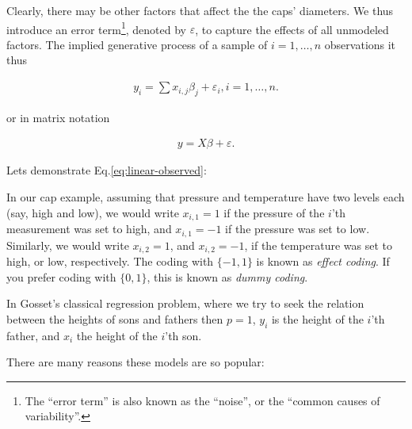 \documentclass[]{book}
\theoremstyle{definition}
\theoremstyle{definition}
\theoremstyle{remark}
\begin{document}
Clearly, there may be other factors that affect the the caps' diameters.
We thus introduce an error term\footnote{The ``error term'' is also
  known as the ``noise'', or the ``common causes of variability''.},
denoted by \(\varepsilon\), to capture the effects of all unmodeled
factors. The implied generative process of a sample of \(i=1,\dots,n\)
observations it thus

\begin{align}
  y_i = \sum x_{i,j} \beta_j + \varepsilon_i , i=1,\dots,n .
  \label{eq:linear-observed}
\end{align}

or in matrix notation

\begin{align}
  y = X \beta + \varepsilon .
  \label{eq:linear-matrix}
\end{align}

Lets demonstrate Eq.\eqref{eq:linear-observed}:

In our cap example, assuming that pressure and temperature have two
levels each (say, high and low), we would write \(x_{i,1}=1\) if the
pressure of the \(i\)'th measurement was set to high, and \(x_{i,1}=-1\)
if the pressure was set to low. Similarly, we would write \(x_{i,2}=1\),
and \(x_{i,2}=-1\), if the temperature was set to high, or low,
respectively. The coding with \(\{-1,1\}\) is known as \emph{effect
coding}. If you prefer coding with \(\{0,1\}\), this is known as
\emph{dummy coding}.

In Gosset's classical regression problem, where we try to seek the
relation between the heights of sons and fathers then \(p=1\), \(y_i\)
is the height of the \(i\)'th father, and \(x_i\) the height of the
\(i\)'th son.

There are many reasons these models are so popular:
\end{document}

